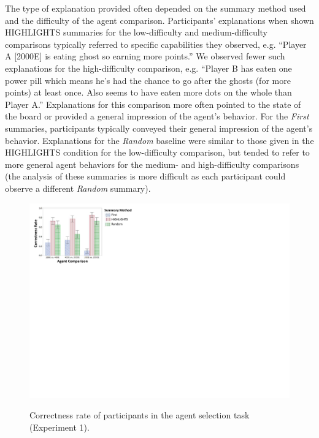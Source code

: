 The type of explanation provided often depended on the summary method used and the difficulty of the agent comparison. Participants' explanations when shown HIGHLIGHTS summaries for the low-difficulty and medium-difficulty comparisons typically referred to specific capabilities they observed, e.g. ``Player A [2000E] is eating ghost so earning more points.'' We observed fewer such explanations for the high-difficulty comparison, e.g. ``Player B has eaten one power pill which means he's had the chance to go after the ghosts (for more points) at least once.  Also seems to have eaten more dots on the whole than Player A.'' Explanations for this comparison more often pointed to the state of the board or provided a general impression of the agent's behavior.
For the \emph{First} summaries, participants typically conveyed their general impression of the agent's behavior. Explanations for the \emph{Random} baseline were similar to those given in the HIGHLIGHTS condition for the low-difficulty comparison, but tended to refer to more general agent behaviors for the medium- and high-difficulty comparisons (the analysis of these summaries is more difficult as each participant could observe a different \emph{Random} summary).

\begin{figure}[h]
	\includegraphics[width=0.9\columnwidth]{figs/correctnessExp1figForPaper.pdf}\\
	\caption{Correctness rate of participants in the agent selection task (Experiment 1).}
	\label{fig:highlightsRes}
	\vspace{-0.3cm}
\end{figure}

